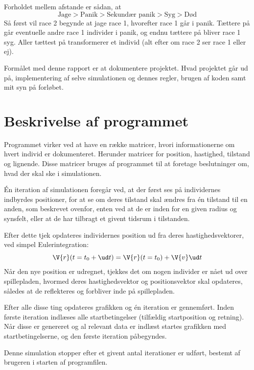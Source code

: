 \documentclass[a4paper,10pt]{article} 	%
\numberwithin{equation}{section}
\begin{document}
	Forholdet mellem afstande er sådan, at 
	\begin{equation*}
		\text{Jage} > \text{Panik} > \text{Sekundær panik} > \text{Syg} > \text{Død}
	\end{equation*}
	Så først vil race 2 begynde at jage race 1, hvorefter race 1 går i panik. Tættere på går eventuelle andre race 1 individer i panik, og endnu tættere på bliver race 1 syg. Aller tættest på transformerer et individ (alt efter om race 2 ser race 1 eller ej).
	
	
	Formålet med denne rapport er at dokumentere projektet. Hvad projektet går ud på, implementering af selve simulationen og dennes regler, brugen af koden samt mit syn på forløbet.
	
	\section{Beskrivelse af programmet}
	Programmet virker ved at have en række matricer, hvori informationerne om hvert individ er dokumenteret. Herunder matricer for position, hastighed, tilstand og lignende. Disse matricer bruges af programmet til at foretage beslutninger om, hvad der skal ske i simulationen. 
	
	Én iteration af simulationen foregår ved, at der først ses på individernes indbyrdes positioner, for at se om deres tilstand skal ændres fra én tilstand til en anden, som beskrevet ovenfor, enten ved at de er inden for en given radius og synsfelt, eller at de har tilbragt et givent tidsrum i tilstanden.
	
	Efter dette tjek opdateres individernes position ud fra deres hastighedsvektorer, ved simpel Eulerintegration:
	\begin{equation*}
		\V{r}(t = t_0+ \ud t) = \V{r}(t=t_0) + \V{v} \ud t
	\end{equation*}
	Når den nye position er udregnet, tjekkes det om nogen individer er nået ud over spillepladen, hvormed deres hastighedsvektor og positionsvektor skal opdateres, således at de reflekteres og forbliver inde på spillepladen.
	
	Efter alle disse ting opdateres grafikken og én iteration er gennemført. Inden første iteration indlæses alle startbetingelser (tilfældig startposition og retning). Når disse er genereret og al relevant data er indlæst startes grafikken med startbetingelserne, og den første iteration påbegyndes.
	
	Denne simulation stopper efter et givent antal iterationer er udført, bestemt af brugeren i starten af programfilen.
	
\end{document}
